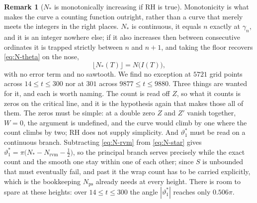 \documentclass[11pt]{article}
\theoremstyle{definition}
\newtheorem{remark}[theorem]{Remark}
\begin{document}
\begin{remark}[$N_{\ast}$ is monotonically increasing if RH is true]
Monotonicity is what makes the curve a counting function outright, rather than a
curve that merely meets the integers in the right places. $N_{\ast}$ is
continuous, it equals $n$ exactly at $\gamma_n$, and it is an integer nowhere
else; if it also increases then between consecutive ordinates it is trapped
strictly between $n$ and $n+1$, and taking the floor recovers
\eqref{eq:N-theta} on the nose,
\begin{equation}\label{eq:floor-N-star}
\bigl\lfloor N_{\ast}(T)\bigr\rfloor=N\bigl(I(T)\bigr),
\end{equation}
with no error term and no sawtooth. We find no exception at $5721$ grid points
across $14\leq t\leq300$ nor at $301$ across $9877\leq t\leq9880$. Three things
are wanted for it, and each is worth naming. The count is read off $Z$, so what
it counts is zeros on the critical line, and it is the hypothesis again that
makes those all of them. The zeros must be simple: at a double zero $Z$ and $Z'$
vanish together, $W=0$, the argument is undefined, and the curve would climb by
one where the count climbs by two; RH does not supply simplicity.
And $\vartheta_1^{\ast}$ must be read on a continuous branch. Subtracting
\eqref{eq:N-rvm} from \eqref{eq:N-star} gives
$\vartheta_1^{\ast}=\pi\bigl(N_{\ast}-N_{\mathrm{rvm}}-\tfrac12\bigr)$, so the
principal branch serves precisely while the exact count and the smooth one stay
within one of each other; since $S$ is unbounded that must eventually fail, and
past it the wrap count has to be carried explicitly, which is the bookkeeping
$N_{\mathrm{ps}}$ already needs at every height. There is room to spare at these
heights: over $14\leq t\leq300$ the angle $|\vartheta_1^{\ast}|$ reaches only
$0.506\pi$.


\end{remark}
\end{document}
